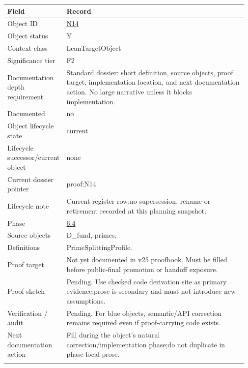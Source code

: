 \begin{longtable}{L{0.16\linewidth} L{0.81\linewidth}}
\hline
\textbf{Field} & \textbf{Record}\\
\hline
Object ID & \hyperlink{object-row-N14}{N14}\\
\hline\addlinespace[0.20em]
Object status & Y\\
\hline\addlinespace[0.20em]
Context class & LeanTargetObject\\
\hline\addlinespace[0.20em]
Significance tier & F2\\
\hline\addlinespace[0.20em]
Documentation depth requirement & Standard dossier: short definition, source objects, proof target, implementation location, and next documentation action. No large narrative unless it blocks implementation.\\
\hline\addlinespace[0.20em]
Documented & no\\
\hline\addlinespace[0.20em]
Object lifecycle state & current\\
\hline\addlinespace[0.20em]
Lifecycle successor/\allowbreak{}current object & none\\
\hline\addlinespace[0.20em]
Current dossier pointer & proof:N14\\
\hline\addlinespace[0.20em]
Lifecycle note & Current register row;\newline no supersession, rename or retirement recorded at this planning snapshot.\\
\hline\addlinespace[0.20em]
Phase & \hyperlink{phase-row-6-4}{6.4}\\
\hline\addlinespace[0.20em]
Source objects & D\_fund, primes.\\
\hline\addlinespace[0.20em]
Definitions & PrimeSplittingProfile.\\
\hline\addlinespace[0.20em]
Proof target & Not yet documented in v25 proofbook. Must be filled before public-final promotion or handoff exposure.\\
\hline\addlinespace[0.20em]
Proof sketch & Pending. Use checked code derivation site as primary evidence;\newline prose is secondary and must not introduce new assumptions.\\
\hline\addlinespace[0.20em]
Verification /\allowbreak{} audit & Pending. For blue objects, semantic/\allowbreak{}API correction remains required even if proof-carrying code exists.\\
\hline\addlinespace[0.20em]
Next documentation action & Fill during the object's natural correction/\allowbreak{}implementation phase;\newline do not duplicate in phase-local prose.\\
\hline\addlinespace[0.20em]
\end{longtable}
